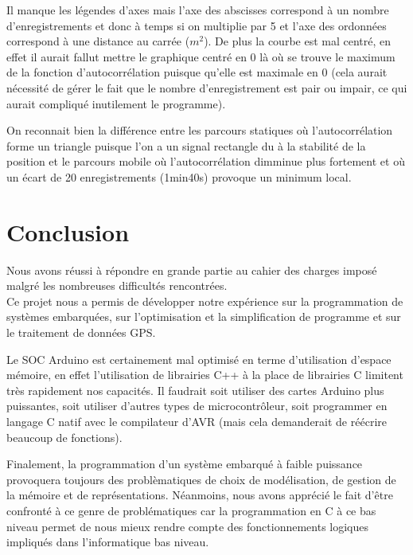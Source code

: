 \documentclass{report}
\begin{document}
Il manque les légendes d'axes mais l'axe des abscisses
correspond à un nombre d'enregistrements et donc à 
temps si on multiplie par 5 et l'axe des ordonnées
correspond à une distance au carrée ($m^{2}$). De plus
la courbe est mal centré, en effet il aurait fallut mettre le graphique
centré en 0 là où se trouve le maximum de la fonction d'autocorrélation
puisque qu'elle est maximale en 0 (cela aurait nécessité de gérer
le fait que le nombre d'enregistrement est pair ou impair, ce qui aurait
compliqué inutilement le programme).

On reconnait bien la différence entre les parcours
statiques où l'autocorrélation forme un triangle
puisque l'on a un signal rectangle du à la stabilité
de la position et le parcours mobile où l'autocorrélation dimminue 
plus fortement et où un écart de 20 enregistrements (1min40s) provoque
un minimum local.

\chapter{Conclusion}

Nous avons réussi à répondre en grande partie au cahier des charges
imposé malgré les nombreuses difficultés rencontrées. \\
Ce projet nous a permis de développer notre expérience sur la
programmation de systèmes embarquées, sur l'optimisation et la
simplification de programme et sur le traitement de données GPS.

Le SOC Arduino est certainement mal optimisé en terme d'utilisation
d'espace mémoire, en effet l'utilisation de librairies C++  à la place
de librairies C limitent très rapidement nos capacités. Il faudrait soit
utiliser des cartes Arduino plus puissantes, soit utiliser d'autres
types de microcontrôleur, soit programmer en langage C natif avec le
compilateur d'AVR (mais cela demanderait de réécrire beaucoup de fonctions).

Finalement, la programmation d'un système embarqué à faible puissance
provoquera toujours des problèmatiques de choix de modélisation, de 
gestion de la mémoire et de représentations. Néanmoins, nous avons
apprécié le fait d'être confronté à ce genre de problématiques car la
programmation en C à ce bas niveau permet de nous mieux rendre compte
des fonctionnements logiques impliqués dans l'informatique bas niveau.
\end{document}
